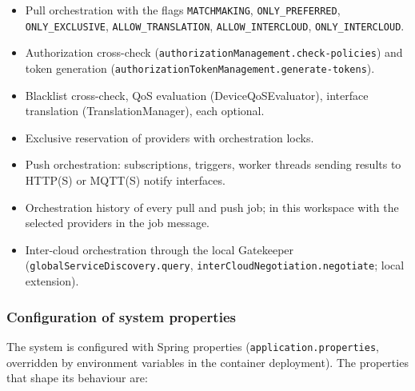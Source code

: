 \documentclass[a4paper]{arrowhead}
\begin{document}
\begin{itemize}
  \item Pull orchestration with the flags \texttt{MATCHMAKING}, \texttt{ONLY\_\allowbreak{}PREFERRED}, \texttt{ONLY\_\allowbreak{}EXCLUSIVE}, \texttt{ALLOW\_\allowbreak{}TRANSLATION}, \texttt{ALLOW\_\allowbreak{}INTERCLOUD}, \texttt{ONLY\_\allowbreak{}INTERCLOUD}.
  \item Authorization cross-check (\texttt{authorization\allowbreak{}Management.\allowbreak{}check-\allowbreak{}policies}) and token generation (\texttt{authorization\allowbreak{}Token\allowbreak{}Management.\allowbreak{}generate-\allowbreak{}tokens}).
  \item Blacklist cross-check, QoS evaluation (Device\allowbreak{}Qo\allowbreak{}SEvaluator), interface translation (Translation\allowbreak{}Manager), each optional.
  \item Exclusive reservation of providers with orchestration locks.
  \item Push orchestration: subscriptions, triggers, worker threads sending results to HTTP(S) or MQTT(S) notify interfaces.
  \item Orchestration history of every pull and push job; in this workspace with the selected providers in the job message.
  \item Inter-cloud orchestration through the local Gatekeeper (\texttt{global\allowbreak{}Service\allowbreak{}Discovery.\allowbreak{}query}, \texttt{inter\allowbreak{}Cloud\allowbreak{}Negotiation.\allowbreak{}negotiate}; local extension).
\end{itemize}

\subsubsection{Configuration of system properties}

The system is configured with Spring properties (\texttt{application.properties}, overridden by environment variables in the container deployment). The properties that shape its behaviour are:
\end{document}
